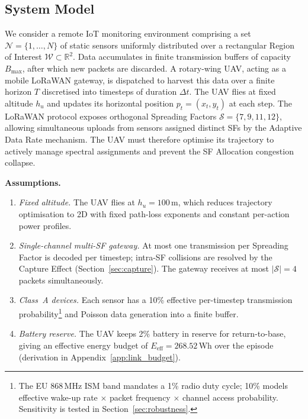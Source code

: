 \subsection{System Model}
\label{sec:env}

We consider a remote IoT monitoring environment comprising a set
$\mathcal{N} = \{1, \ldots, N\}$ of static sensors uniformly
distributed over a rectangular Region of Interest
$\mathcal{W}\subset\mathbb{R}^2$. Data accumulates in finite
transmission buffers of capacity $B_{\max}$, after which new packets
are discarded. A rotary-wing UAV, acting as a mobile LoRaWAN gateway,
is dispatched to harvest this data over a finite horizon $T$
discretised into timesteps of duration $\Delta t$. The UAV flies at
fixed altitude $h_u$ and updates its horizontal position
$p_t = (x_t, y_t)$ at each step. The LoRaWAN protocol exposes
orthogonal Spreading Factors $\mathcal{S}=\{7, 9, 11, 12\}$, allowing
simultaneous uploads from sensors assigned distinct SFs by the
Adaptive Data Rate mechanism. The UAV must therefore optimise its
trajectory to actively manage spectral assignments and prevent the
SF Allocation congestion collapse.

\noindent\textbf{Assumptions.}
\begin{enumerate}
    \item \textit{Fixed altitude.} The UAV flies at $h_u = 100$\,m, which reduces trajectory optimisation to 2D with fixed path-loss exponents and constant per-action power profiles.
    \item \textit{Single-channel multi-SF gateway.} At most one transmission per Spreading Factor is decoded per timestep; intra-SF collisions are resolved by the Capture Effect (Section~\ref{sec:capture}). The gateway receives at most $|\mathcal{S}|=4$ packets simultaneously.
    \item \textit{Class~A devices.} Each sensor has a 10\% effective per-timestep transmission probability\footnote{The EU 868\,MHz ISM band mandates a 1\% radio duty cycle; 10\% models effective wake-up rate $\times$ packet frequency $\times$ channel access probability. Sensitivity is tested in Section~\ref{sec:robustness}.} and Poisson data generation into a finite buffer.
    \item \textit{Battery reserve.} The UAV keeps 2\% battery in reserve for return-to-base, giving an effective energy budget of $E_{\mathrm{eff}} = 268.52$\,Wh over the episode (derivation in Appendix~\ref{app:link_budget}).
\end{enumerate}

